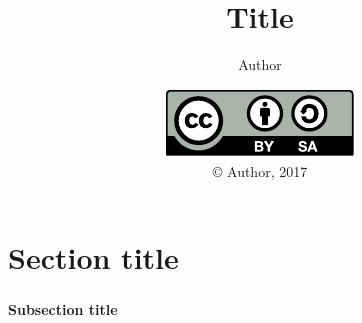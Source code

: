 \documentclass[mathserif]{beamer}
\title{Title}
\author{Author}
\date{\includegraphics{../LicenseLogo}\\\copyright{} Author, 2017}
\newenvironment{namedframe}[1]%
	{\begin{frame}\frametitle{\secname}\framesubtitle{#1}}
	{\end{frame}}
\begin{document}
	\frame{\titlepage}
	\section{Section title}
	\begin{namedframe}{Subsection title}
	\end{namedframe}
\end{document}

